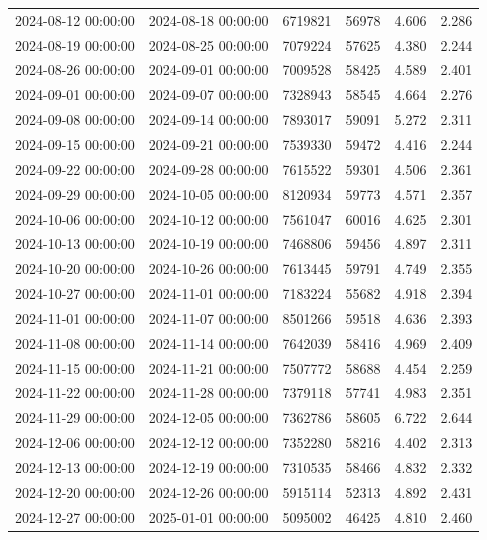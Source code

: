 \begin{tabular}{llrrrr}
2024-08-12 00:00:00 & 2024-08-18 00:00:00 & 6719821 & 56978 & 4.606 & 2.286 \\
2024-08-19 00:00:00 & 2024-08-25 00:00:00 & 7079224 & 57625 & 4.380 & 2.244 \\
2024-08-26 00:00:00 & 2024-09-01 00:00:00 & 7009528 & 58425 & 4.589 & 2.401 \\
2024-09-01 00:00:00 & 2024-09-07 00:00:00 & 7328943 & 58545 & 4.664 & 2.276 \\
2024-09-08 00:00:00 & 2024-09-14 00:00:00 & 7893017 & 59091 & 5.272 & 2.311 \\
2024-09-15 00:00:00 & 2024-09-21 00:00:00 & 7539330 & 59472 & 4.416 & 2.244 \\
2024-09-22 00:00:00 & 2024-09-28 00:00:00 & 7615522 & 59301 & 4.506 & 2.361 \\
2024-09-29 00:00:00 & 2024-10-05 00:00:00 & 8120934 & 59773 & 4.571 & 2.357 \\
2024-10-06 00:00:00 & 2024-10-12 00:00:00 & 7561047 & 60016 & 4.625 & 2.301 \\
2024-10-13 00:00:00 & 2024-10-19 00:00:00 & 7468806 & 59456 & 4.897 & 2.311 \\
2024-10-20 00:00:00 & 2024-10-26 00:00:00 & 7613445 & 59791 & 4.749 & 2.355 \\
2024-10-27 00:00:00 & 2024-11-01 00:00:00 & 7183224 & 55682 & 4.918 & 2.394 \\
2024-11-01 00:00:00 & 2024-11-07 00:00:00 & 8501266 & 59518 & 4.636 & 2.393 \\
2024-11-08 00:00:00 & 2024-11-14 00:00:00 & 7642039 & 58416 & 4.969 & 2.409 \\
2024-11-15 00:00:00 & 2024-11-21 00:00:00 & 7507772 & 58688 & 4.454 & 2.259 \\
2024-11-22 00:00:00 & 2024-11-28 00:00:00 & 7379118 & 57741 & 4.983 & 2.351 \\
2024-11-29 00:00:00 & 2024-12-05 00:00:00 & 7362786 & 58605 & 6.722 & 2.644 \\
2024-12-06 00:00:00 & 2024-12-12 00:00:00 & 7352280 & 58216 & 4.402 & 2.313 \\
2024-12-13 00:00:00 & 2024-12-19 00:00:00 & 7310535 & 58466 & 4.832 & 2.332 \\
2024-12-20 00:00:00 & 2024-12-26 00:00:00 & 5915114 & 52313 & 4.892 & 2.431 \\
2024-12-27 00:00:00 & 2025-01-01 00:00:00 & 5095002 & 46425 & 4.810 & 2.460 \\
\bottomrule
\end{tabular}
